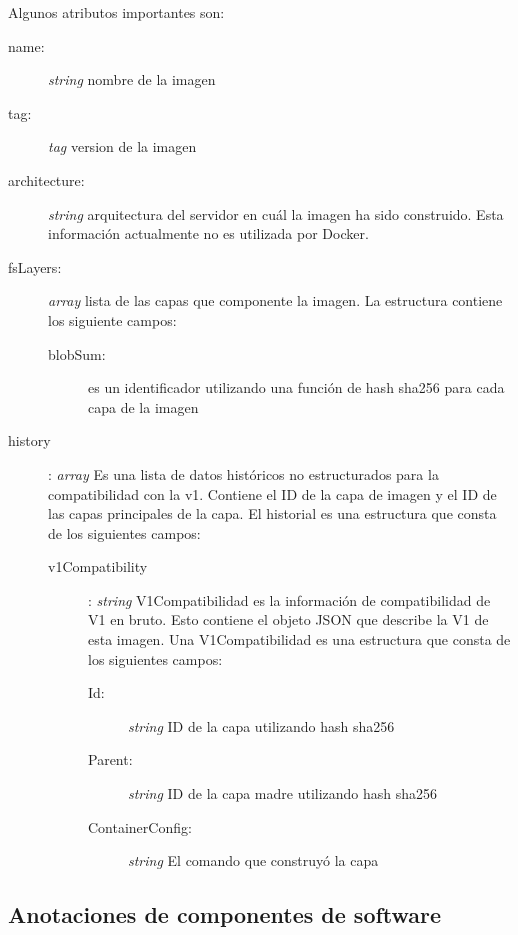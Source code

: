Algunos atributos importantes son:

\begin{description}
	\item [name:] \textit{string} nombre de la imagen
	\item [tag:] \textit{tag} version de la imagen
	\item [architecture:] \textit{string} arquitectura del servidor en cuál la imagen ha sido construido. Esta información actualmente no es utilizada por Docker.
	\item [fsLayers:] \textit{array} lista de las capas que componente la imagen.
		La estructura contiene los siguiente campos:
		\begin{description}
			\item [blobSum:] es un identificador utilizando una función de hash sha256 para cada capa de la imagen 
		\end{description}
	\item [history]: \textit{array} Es una lista de datos históricos no estructurados para la compatibilidad con la v1. Contiene el ID de la capa de imagen y el ID de las capas principales de la capa. El historial es una estructura que consta de los siguientes campos:
	\begin{description}
		\item[v1Compatibility]:  \textit{string} V1Compatibilidad es la información de compatibilidad de V1 en bruto. Esto contiene el objeto JSON que describe la V1 de esta imagen. Una V1Compatibilidad es una estructura que consta de los siguientes campos:
		
		\begin{description}
			\item [Id:] \textit{string} ID de la capa utilizando hash sha256			\item [Parent:] \textit{string} ID de la capa madre utilizando hash sha256
				\item [ContainerConfig:] \textit{string} El comando que construyó la capa
		\end{description}
	\end{description}
\end{description}



\subsection{Anotaciones de componentes de software}\label{s4.2.2}

